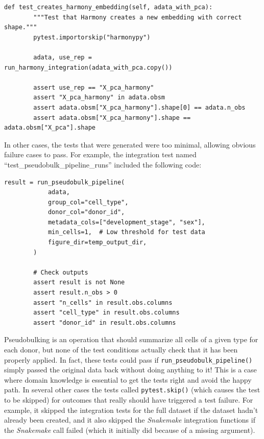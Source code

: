 \begin{lstlisting}[style=Python]
def test_creates_harmony_embedding(self, adata_with_pca):
        """Test that Harmony creates a new embedding with correct shape."""
        pytest.importorskip("harmonypy")

        adata, use_rep = run_harmony_integration(adata_with_pca.copy())

        assert use_rep == "X_pca_harmony"
        assert "X_pca_harmony" in adata.obsm
        assert adata.obsm["X_pca_harmony"].shape[0] == adata.n_obs
        assert adata.obsm["X_pca_harmony"].shape == adata.obsm["X_pca"].shape
\end{lstlisting}

In other cases, the tests that were generated were too minimal, allowing obvious failure cases to pass. For example, the integration test named ``test\_pseudobulk\_pipeline\_runs'' included the following code:

\begin{lstlisting}[style=Python]
result = run_pseudobulk_pipeline(
            adata,
            group_col="cell_type",
            donor_col="donor_id",
            metadata_cols=["development_stage", "sex"],
            min_cells=1,  # Low threshold for test data
            figure_dir=temp_output_dir,
        )

        # Check outputs
        assert result is not None
        assert result.n_obs > 0
        assert "n_cells" in result.obs.columns
        assert "cell_type" in result.obs.columns
        assert "donor_id" in result.obs.columns
\end{lstlisting}

Pseudobulking is an operation that should summarize all cells of a given type for each donor, but none of the test conditions actually check that it has been properly applied.  In fact, these tests could pass if \texttt{run\_pseudobulk\_pipeline()} simply passed the original data back without doing anything to it!  This is a case where domain knowledge is essential to get the tests right and avoid the happy path.  In several other cases the tests called \texttt{pytest.skip()} (which causes the test to be skipped) for outcomes that really should have triggered a test failure.  For example, it skipped the integration tests for the full dataset if the dataset hadn't already been created, and it also skipped the \textit{Snakemake} integration functions if the \textit{Snakemake} call failed (which it initially did because of a missing argument).

